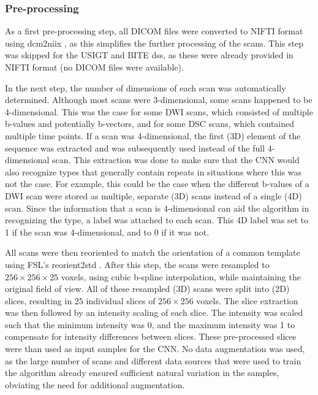 \subsubsection{Pre-processing}
\label{sec:preprocessing}
As a first pre-processing step, all \gls{DICOM} files were converted to \gls{NIFTI} format using dcm2niix \autocite{li2016first}, as this simplifies the further processing of the \glspl{scan}.
This step was skipped for the \gls{USIGT} and \gls{BITE} \glspl{ds}, as these were already provided in \gls{NIFTI} format (no \gls{DICOM} files were available).

In the next step, the number of dimensions of each \gls{scan} was automatically determined.
Although most \glspl{scan} were 3-dimensional, some \glspl{scan} happened to be 4-dimensional.
This was the case for some \gls{DWI} \glspl{scan}, which consisted of multiple b-values and potentially b-vectors, and for some \gls{DSC} \glspl{scan}, which contained multiple time points.
If a \gls{scan} was 4-dimensional, the first (3D) element of the sequence was extracted and was subsequently used instead of the full 4-dimensional \gls{scan}.
This extraction was done to make sure that the \gls{CNN} would also recognize \glspl{type} that generally contain repeats in situations where this was not the case.
For example, this could be the case when the different b-values of a \gls{DWI} \gls{scan} were stored as multiple, separate (3D) \glspl{scan} instead of a single (4D) \gls{scan}.
Since the information that a \gls{scan} is 4-dimensional can aid the algorithm in recognizing the \gls{type}, a  label was attached to each \gls{scan}.
This 4D label was set to 1 if the \gls{scan} was 4-dimensional, and to 0 if it was not.

All \glspl{scan} were then reoriented to match the orientation of a common template using FSL's reorient2std \autocite{jenkinson2012fsl}.
After this step, the \glspl{scan} were resampled to $ 256 \times 256 \times 25$ voxels, using cubic b-spline interpolation, while maintaining the original field of view.
All of these resampled (3D) \glspl{scan} were split into (2D) \glspl{slice}, resulting in 25 individual \glspl{slice} of $256 \times 256$ voxels.
The \gls{slice} extraction was then followed by an intensity scaling of each \gls{slice}.
The intensity was scaled such that the minimum intensity was 0, and the maximum intensity was 1 to compensate for intensity differences between \glspl{slice}.
These pre-processed \glspl{slice} were than used as input \glspl{sample} for the \gls{CNN}.
No data augmentation was used, as the large number of \glspl{scan} and different data sources that were used to train the algorithm already ensured sufficient natural variation in the \glspl{sample}, obviating the need for additional augmentation.

